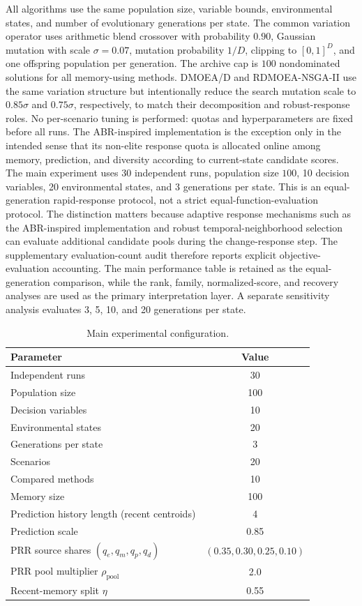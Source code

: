 \documentclass[1p,times]{elsarticle}
\begin{document}
All algorithms use the same population size, variable bounds, environmental states, and number of evolutionary generations per state. The common variation operator uses arithmetic blend crossover with probability $0.90$, Gaussian mutation with scale $\sigma=0.07$, mutation probability $1/D$, clipping to $[0,1]^D$, and one offspring population per generation. The archive cap is $100$ nondominated solutions for all memory-using methods. DMOEA/D and RDMOEA-NSGA-II use the same variation structure but intentionally reduce the search mutation scale to $0.85\sigma$ and $0.75\sigma$, respectively, to match their decomposition and robust-response roles. No per-scenario tuning is performed: quotas and hyperparameters are fixed before all runs. The ABR-inspired implementation is the exception only in the intended sense that its non-elite response quota is allocated online among memory, prediction, and diversity according to current-state candidate scores. The main experiment uses 30 independent runs, population size $100$, 10 decision variables, 20 environmental states, and 3 generations per state. This is an equal-generation rapid-response protocol, not a strict equal-function-evaluation protocol. The distinction matters because adaptive response mechanisms such as the ABR-inspired implementation and robust temporal-neighborhood selection can evaluate additional candidate pools during the change-response step. The supplementary evaluation-count audit therefore reports explicit objective-evaluation accounting. The main performance table is retained as the equal-generation comparison, while the rank, family, normalized-score, and recovery analyses are used as the primary interpretation layer. A separate sensitivity analysis evaluates 3, 5, 10, and 20 generations per state.

\begin{table}[htbp]
\centering
\caption{Main experimental configuration.}
\label{tab:config}
\begin{tabular}{lc}
\toprule
Parameter & Value \\
\midrule
Independent runs & 30 \\
Population size & 100 \\
Decision variables & 10 \\
Environmental states & 20 \\
Generations per state & 3 \\
Scenarios & 20 \\
Compared methods & 10 \\
Memory size & 100 \\
Prediction history length (recent centroids) & 4 \\
Prediction scale & 0.85 \\
PRR source shares $(q_e,q_m,q_p,q_d)$ & $(0.35,0.30,0.25,0.10)$ \\
PRR pool multiplier $\rho_{\mathrm{pool}}$ & 2.0 \\
Recent-memory split $\eta$ & 0.55 \\
\bottomrule
\end{tabular}
\end{table}
\end{document}
